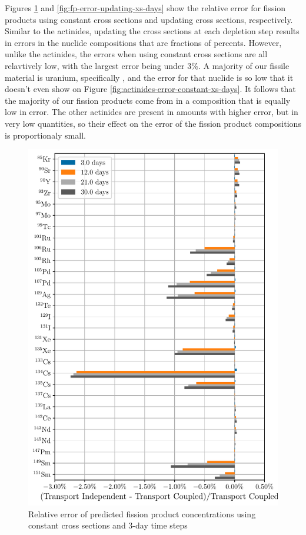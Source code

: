         
    Figures \ref{fig:fp-error-constant-xs-days} and
    \ref{fig:fp-error-updating-xs-days}
    show the relative error for fission products using constant cross sections
    and updating cross sections, respectively.
    Similar to the actinides, updating the cross sections at each depletion step
    results in errors in the nuclide compositions  that are fractions of
    percents. However, unlike the actinides, the errors when using constant
    cross sections are all relavtively low, with the largest error being under
    3\%. A majority of our fissile material is uranium, specifically
    , and the error for that nuclide is so low that it doesn't even
    show on Figure \ref{fig:actinides-error-constant-xs-days}. It follows that the
    majority of our fission products come from  in a composition
    that is equally low in error. The other actinides are present in amounts
    with higher error, but in very low quantities, so their effect on the error
    of the fission product compositions is proportionaly small.

    \begin{figure}[h!tpb]
        \centering
        \includegraphics[width=\linewidth]{figs/fission_products_constant_xs_predictor_fission_q_days.pdf}
        \caption{Relative error of predicted fission product concentrations
        using constant cross sections and 3-day time steps}
        \label{fig:fp-error-constant-xs-days}
    \end{figure}


